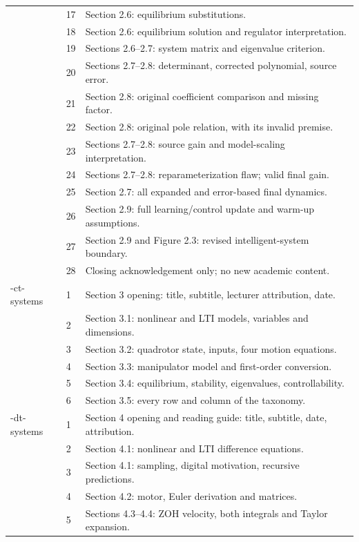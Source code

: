 \documentclass[11pt,a4paper]{article}
\numberwithin{equation}{section}
\numberwithin{figure}{section}
\numberwithin{table}{section}
\begin{document}
\begin{longtable}{@{}P{29mm}P{14mm}P{105mm}@{}}
 & 17 & Section 2.6: equilibrium substitutions.\\
 & 18 & Section 2.6: equilibrium solution and regulator interpretation.\\
 & 19 & Sections 2.6--2.7: system matrix and eigenvalue criterion.\\
 & 20 & Sections 2.7--2.8: determinant, corrected polynomial, source error.\\
 & 21 & Section 2.8: original coefficient comparison and missing factor.\\
 & 22 & Section 2.8: original pole relation, with its invalid premise.\\
 & 23 & Sections 2.7--2.8: source gain and model-scaling interpretation.\\
 & 24 & Sections 2.7--2.8: reparameterization flaw; valid final gain.\\
 & 25 & Section 2.7: all expanded and error-based final dynamics.\\
 & 26 & Section 2.9: full learning/control update and warm-up assumptions.\\
 & 27 & Section 2.9 and Figure 2.3: revised intelligent-system boundary.\\
 & 28 & Closing acknowledgement only; no new academic content.\\
-\allowbreak ct-\allowbreak systems & 1 & Section 3 opening: title, subtitle, lecturer attribution, date.\\
 & 2 & Section 3.1: nonlinear and LTI models, variables and dimensions.\\
 & 3 & Section 3.2: quadrotor state, inputs, four motion equations.\\
 & 4 & Section 3.3: manipulator model and first-order conversion.\\
 & 5 & Section 3.4: equilibrium, stability, eigenvalues, controllability.\\
 & 6 & Section 3.5: every row and column of the taxonomy.\\
-\allowbreak dt-\allowbreak systems & 1 & Section 4 opening and reading guide: title, subtitle, date, attribution.\\
 & 2 & Section 4.1: nonlinear and LTI difference equations.\\
 & 3 & Section 4.1: sampling, digital motivation, recursive predictions.\\
 & 4 & Section 4.2: motor, Euler derivation and matrices.\\
 & 5 & Sections 4.3--4.4: ZOH velocity, both integrals and Taylor expansion.\\

\end{longtable}
\end{document}
